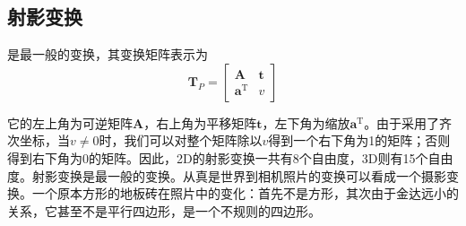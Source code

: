 \subsection{射影变换}
是最一般的变换，其变换矩阵表示为
\begin{equation}
    \bm{T}_P = 
    \begin{bmatrix}
        \bm{A} & \bm{t} \\
        \bm{a}^{\text{T}} & v
    \end{bmatrix}
\end{equation}

它的左上角为可逆矩阵$\bm{A}$，右上角为平移矩阵$\bm{t}$，左下角为缩放$\bm{a}^{\text{T}}$。由于采用了齐次坐标，当$v \neq 0$时，我们可以对整个矩阵除以$v$得到一个右下角为1的矩阵；否则得到右下角为$0$的矩阵。因此，2D的射影变换一共有8个自由度，3D则有15个自由度。射影变换是最一般的变换。从真是世界到相机照片的变换可以看成一个摄影变换。一个原本方形的地板砖在照片中的变化：首先不是方形，其次由于金达远小的关系，它甚至不是平行四边形，是一个不规则的四边形。

